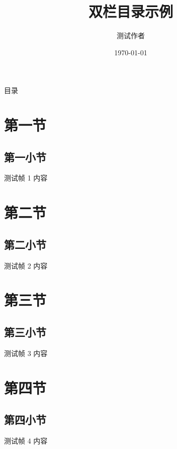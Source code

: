 \documentclass[aspectratio=169, hyperref, UTF8, CJK]{beamer}
\title{双栏目录示例}
\author{测试作者}
\institute{北京理工大学}
\date{\today}
\begin{document}
\begin{frame}{目录}
  \tableofcontents
\end{frame}

\section{第一节}
\subsection{第一小节}
\begin{frame}{测试帧 1}
  内容
\end{frame}

\section{第二节}
\subsection{第二小节}
\begin{frame}{测试帧 2}
  内容
\end{frame}

\section{第三节}
\subsection{第三小节}
\begin{frame}{测试帧 3}
  内容
\end{frame}

\section{第四节}
\subsection{第四小节}
\begin{frame}{测试帧 4}
  内容
\end{frame}
\end{document}
